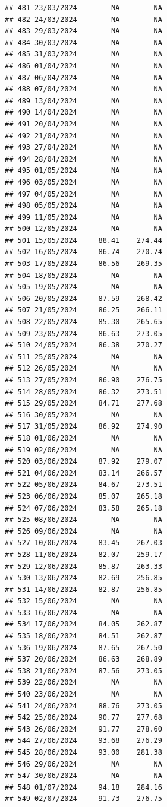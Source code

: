 \documentclass[
]{article}
\begin{document}
\begin{verbatim}
## 481 23/03/2024        NA        NA
## 482 24/03/2024        NA        NA
## 483 29/03/2024        NA        NA
## 484 30/03/2024        NA        NA
## 485 31/03/2024        NA        NA
## 486 01/04/2024        NA        NA
## 487 06/04/2024        NA        NA
## 488 07/04/2024        NA        NA
## 489 13/04/2024        NA        NA
## 490 14/04/2024        NA        NA
## 491 20/04/2024        NA        NA
## 492 21/04/2024        NA        NA
## 493 27/04/2024        NA        NA
## 494 28/04/2024        NA        NA
## 495 01/05/2024        NA        NA
## 496 03/05/2024        NA        NA
## 497 04/05/2024        NA        NA
## 498 05/05/2024        NA        NA
## 499 11/05/2024        NA        NA
## 500 12/05/2024        NA        NA
## 501 15/05/2024     88.41    274.44
## 502 16/05/2024     86.74    270.74
## 503 17/05/2024     86.56    269.35
## 504 18/05/2024        NA        NA
## 505 19/05/2024        NA        NA
## 506 20/05/2024     87.59    268.42
## 507 21/05/2024     86.25    266.11
## 508 22/05/2024     85.30    265.65
## 509 23/05/2024     86.63    273.05
## 510 24/05/2024     86.38    270.27
## 511 25/05/2024        NA        NA
## 512 26/05/2024        NA        NA
## 513 27/05/2024     86.90    276.75
## 514 28/05/2024     86.32    273.51
## 515 29/05/2024     84.71    277.68
## 516 30/05/2024        NA        NA
## 517 31/05/2024     86.92    274.90
## 518 01/06/2024        NA        NA
## 519 02/06/2024        NA        NA
## 520 03/06/2024     87.92    279.07
## 521 04/06/2024     83.14    266.57
## 522 05/06/2024     84.67    273.51
## 523 06/06/2024     85.07    265.18
## 524 07/06/2024     83.58    265.18
## 525 08/06/2024        NA        NA
## 526 09/06/2024        NA        NA
## 527 10/06/2024     83.45    267.03
## 528 11/06/2024     82.07    259.17
## 529 12/06/2024     85.87    263.33
## 530 13/06/2024     82.69    256.85
## 531 14/06/2024     82.87    256.85
## 532 15/06/2024        NA        NA
## 533 16/06/2024        NA        NA
## 534 17/06/2024     84.05    262.87
## 535 18/06/2024     84.51    262.87
## 536 19/06/2024     87.65    267.50
## 537 20/06/2024     86.63    268.89
## 538 21/06/2024     87.56    273.05
## 539 22/06/2024        NA        NA
## 540 23/06/2024        NA        NA
## 541 24/06/2024     88.76    273.05
## 542 25/06/2024     90.77    277.68
## 543 26/06/2024     91.77    278.60
## 544 27/06/2024     93.68    276.29
## 545 28/06/2024     93.00    281.38
## 546 29/06/2024        NA        NA
## 547 30/06/2024        NA        NA
## 548 01/07/2024     94.18    284.16
## 549 02/07/2024     91.73    276.75

\end{verbatim}
\end{document}
